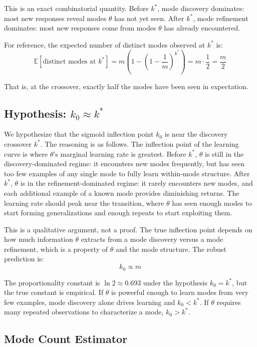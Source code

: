 \documentclass[11pt]{article}
\newcommand{\E}{\mathbb{E}}
\begin{document}
This is an exact combinatorial quantity. Before $k^*$, mode discovery dominates: most new responses reveal modes $\theta$ has not yet seen. After $k^*$, mode refinement dominates: most new responses come from modes $\theta$ has already encountered.

For reference, the expected number of distinct modes observed at $k^*$ is:
\begin{equation}
    \E[\text{distinct modes at } k^*] = m\!\left(1 - \left(1 - \frac{1}{m}\right)^{k^*}\right) = m \cdot \frac{1}{2} = \frac{m}{2}
\end{equation}

That is, at the crossover, exactly half the modes have been seen in expectation.

\subsection*{Hypothesis: $k_0 \approx k^*$}

We hypothesize that the sigmoid inflection point $k_0$ is near the discovery crossover $k^*$. The reasoning is as follows. The inflection point of the learning curve is where $\theta$'s marginal learning rate is greatest. Before $k^*$, $\theta$ is still in the discovery-dominated regime: it encounters new modes frequently, but has seen too few examples of any single mode to fully learn within-mode structure. After $k^*$, $\theta$ is in the refinement-dominated regime: it rarely encounters new modes, and each additional example of a known mode provides diminishing returns. The learning rate should peak near the transition, where $\theta$ has seen enough modes to start forming generalizations and enough repeats to start exploiting them.

This is a qualitative argument, not a proof. The true inflection point depends on how much information $\theta$ extracts from a mode discovery versus a mode refinement, which is a property of $\theta$ and the mode structure. The robust prediction is:
\begin{equation}
    k_0 \propto m
\end{equation}

The proportionality constant is $\ln 2 \approx 0.693$ under the hypothesis $k_0 = k^*$, but the true constant is empirical. If $\theta$ is powerful enough to learn modes from very few examples, mode discovery alone drives learning and $k_0 < k^*$. If $\theta$ requires many repeated observations to characterize a mode, $k_0 > k^*$.

\subsection*{Mode Count Estimator}
\end{document}
